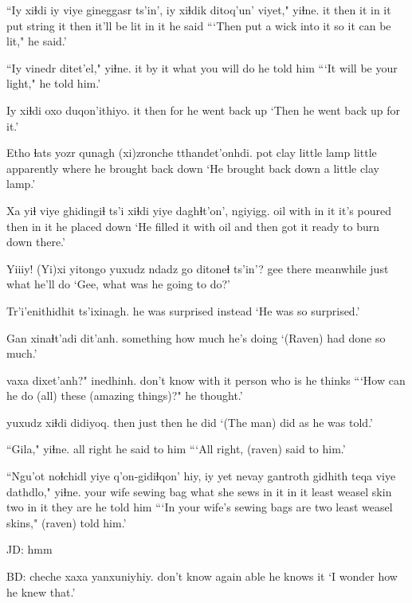 \documentclass[12pt]{article}
\begin{document}
\gll ``Iy xiɬdi iy viye gineggasr ts'in', iy xiɬdik ditoq'un' viyet," yiɬne.
it then it {in it} {put string} {} it then {it'll be lit} {in it} {he said}
\glt ```Then put a wick into it so it can be lit," he said.'
\glend

\gll ``Iy vinedr ditet'el," yiɬne.
it {by it} {what you will do} {he told him}
\glt ```It will be your light," he told him.'
\glend

\gll Iy xiɬdi oxo duqon'ithiyo.
it then for {he went back up}
\glt `Then he went back up for it.'
\glend

\gll Etho ɬats yozr qunagh (xi)zronche tthandet'onhdi.
pot clay little lamp little apparently {where he brought back down}
\glt `He brought back down a little clay lamp.'
\glend

\gll Xa yiɬ viye ghidingiɬ ts'i xiɬdi yiye daghɬt'on', ngiyigg.
oil with {in it} {it's poured} {} then {in it} {he placed} down
\glt `He filled it with oil and then got it ready to burn down there.'
\glend

\gll Yiiiy! (Yi)xi yitongo yuxudz {ndadz go} ditoneɬ ts'in'?
gee there meanwhile just what {he'll do} {}
\glt `Gee, what was he going to do?'
\glend

\gll Tr'i'enithidhit ts'ixinagh.
{he was surprised} instead
\glt `He was so surprised.'
\glend

\gll Gan xinaɬt'adi dit'anh.
something {how much} {he's doing}
\glt `(Raven) had done so much.'
\glend

 vaxa dixet'anh?" inedhinh.
{don't know} {with it} {person who is} {he thinks}
\glt ```How can he do (all) these (amazing things)?" he thought.'
\glend

 yuxudz xiɬdi didiyoq.
then just then {he did}
\glt `(The man) did as he was told.'
\glend

\gll ``Gila," yiɬne.
{all right} {he said to him}
\glt ```All right, (raven) said to him.'
\glend

\gll ``Ngu'ot noɬchidl {yiye q'on-gidiɬqon' hiy}, iy yet {nevay gantroth} gidhith teqa viye dathdlo," yiɬne.
{your wife} {sewing bag} {what she sews in} it {in it} {least weasel} skin two {in it} {they are} {he told him}
\glt ```In your wife's sewing bags are two least weasel skins," (raven) told him.'
\glend

JD:  hmm

BD:
 cheche xaxa yanxuniyhiy.
{don't know} again able {he knows it}
\glt `I wonder how he knew that.'
\glend
\end{document}
